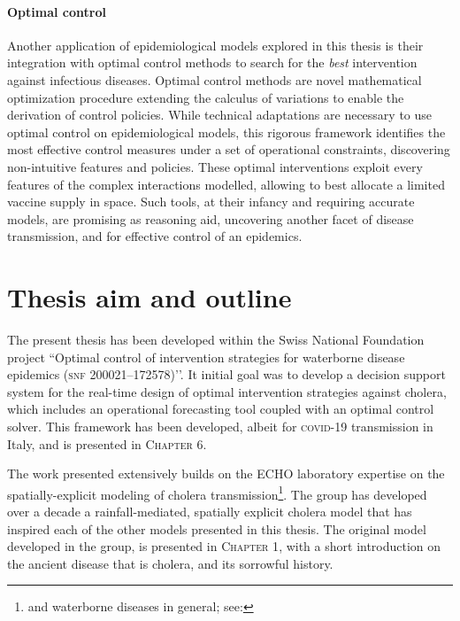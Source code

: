 \paragraph{Optimal control} Another application of epidemiological models explored in this thesis is their integration with optimal control methods to search for the \textit{best} intervention against infectious diseases. Optimal control methods are novel mathematical optimization procedure extending the calculus of variations to enable the derivation of control policies. While technical adaptations are necessary to use optimal control on epidemiological models, this rigorous framework identifies the most effective control measures under a set of operational constraints, discovering non-intuitive features and policies. These optimal interventions exploit every features of the complex interactions modelled, allowing to \eg best allocate a limited vaccine supply in space. Such tools, at their infancy and requiring accurate models, are promising as reasoning aid, uncovering another facet of disease transmission, and for effective control of an epidemics.




\section{Thesis aim and outline}

The present thesis has been developed within the Swiss National Foundation project ``Optimal control of intervention strategies for waterborne disease epidemics (\textsc{snf} 200021–172578)’’. It initial goal was to develop a decision support system for the real-time design of optimal intervention strategies against cholera, which includes an operational forecasting tool coupled with an optimal control solver. This framework has been developed, albeit for \textsc{covid}-19 transmission in Italy, and is presented in \textsc{Chapter 6}. 


The work presented extensively builds on the ECHO laboratory expertise on the spatially-explicit modeling of cholera transmission\footnote{and waterborne diseases in general; see: }. The group has developed over a decade a rainfall-mediated, spatially explicit cholera model that has inspired each of the other models presented in this thesis. The original model developed in the group, is presented in \textsc{Chapter 1}, with a short introduction on the ancient disease that is cholera, and its sorrowful history.

